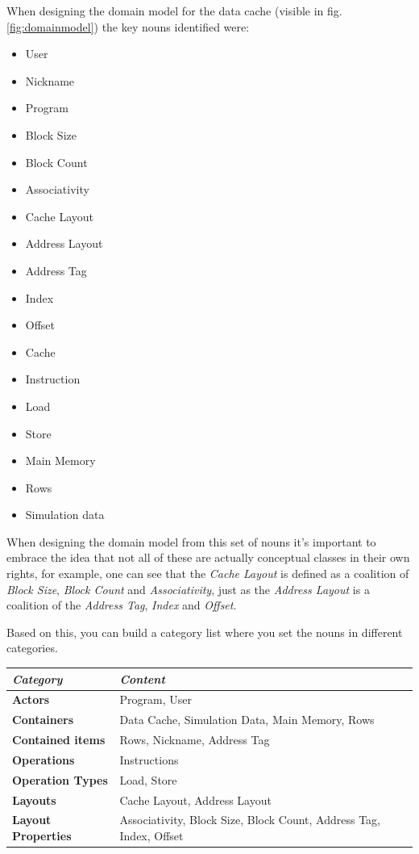 \documentclass[a4paper]{scrreprt}
\begin{document}
When designing the domain model for the data cache (visible in fig. \ref{fig:domainmodel}) the key nouns identified were:

\begin{itemize}
\item User
\item Nickname
\item Program
\item Block Size
\item Block Count
\item Associativity
\item Cache Layout
\item Address Layout
\item Address Tag
\item Index
\item Offset
\item Cache
\item Instruction
\item Load
\item Store
\item Main Memory
\item Rows
\item Simulation data
\end{itemize}

When designing the domain model from this set of nouns it's important to embrace the idea that not all of these are actually conceptual classes in their own rights, for example, one can see that the \textit{Cache Layout} is defined as a coalition of \textit{Block Size}, \textit{Block Count} and \textit{Associativity}, just as the \textit{Address Layout} is a coalition of the \textit{Address Tag}, \textit{Index} and \textit{Offset}.

Based on this, you can build a category list where you set the nouns in different categories.

\begin{center}
	\begin{tabular}{| l | l |}
	\hline
	\textit{Category} & \textit{Content}
	\\ \hline
	\textbf{Actors} & Program, User
	\\ \hline
	\textbf{Containers} & Data Cache, Simulation Data, Main Memory, Rows
	\\ \hline
	\textbf{Contained items} & Rows, Nickname, Address Tag
	\\ \hline
	\textbf{Operations} & Instructions
	\\ \hline
	\textbf{Operation Types} & Load, Store
	\\ \hline
	\textbf{Layouts} & Cache Layout, Address Layout
	\\ \hline
	\textbf{Layout Properties} & Associativity, Block Size, Block Count, Address Tag, Index, Offset\\
	\hline
	\end{tabular}
\end{center}
\end{document}
